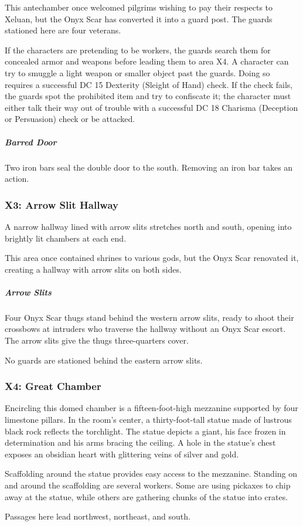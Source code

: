 \documentclass[10pt,a4paper,twoside,bg=print,twocolumn,openany,nodeprecatedcode]{dndbook}
\begin{document}
This antechamber once welcomed pilgrims wishing to pay their respects to Xeluan, but the Onyx Scar has converted it into a guard post. The guards stationed here are four veterans.

If the characters are pretending to be workers, the guards search them for concealed armor and weapons before leading them to area X4. A character can try to smuggle a light weapon or smaller object past the guards. Doing so requires a successful DC 15 Dexterity (Sleight of Hand) check. If the check fails, the guards spot the prohibited item and try to confiscate it; the character must either talk their way out of trouble with a successful DC 18 Charisma (Deception or Persuasion) check or be attacked.

\subparagraph{Barred Door}
Two iron bars seal the double door to the south. Removing an iron bar takes an action.

\subsubsection{X3: Arrow Slit Hallway}
\begin{DndReadAloud}{}
A narrow hallway lined with arrow slits stretches north and south, opening into brightly lit chambers at each end.

\end{DndReadAloud}

This area once contained shrines to various gods, but the Onyx Scar renovated it, creating a hallway with arrow slits on both sides.

\subparagraph{Arrow Slits}
Four Onyx Scar thugs stand behind the western arrow slits, ready to shoot their crossbows at intruders who traverse the hallway without an Onyx Scar escort. The arrow slits give the thugs three-quarters cover.

No guards are stationed behind the eastern arrow slits.

\subsubsection{X4: Great Chamber}
\begin{DndReadAloud}{}
Encircling this domed chamber is a fifteen-foot-high mezzanine supported by four limestone pillars. In the room's center, a thirty-foot-tall statue made of lustrous black rock reflects the torchlight. The statue depicts a giant, his face frozen in determination and his arms bracing the ceiling. A hole in the statue's chest exposes an obsidian heart with glittering veins of silver and gold.

Scaffolding around the statue provides easy access to the mezzanine. Standing on and around the scaffolding are several workers. Some are using pickaxes to chip away at the statue, while others are gathering chunks of the statue into crates.

Passages here lead northwest, northeast, and south.

\end{DndReadAloud}
\end{document}
